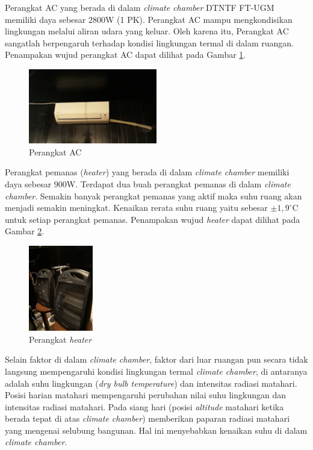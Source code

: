 Perangkat AC yang berada di dalam \textit{climate chamber} DTNTF FT-UGM memiliki daya sebesar 2800W (1 PK). Perangkat AC mampu mengkondisikan lingkungan melalui aliran udara yang keluar. Oleh karena itu, Perangkat AC sangatlah berpengaruh terhadap kondisi lingkungan termal di dalam ruangan. Penampakan wujud perangkat AC dapat dilihat pada Gambar \ref{fig:4:AC}.\\

\begin{figure}[!h]
	\centering
	\includegraphics[width=0.5\textwidth]{figures/AC}
	\caption{Perangkat AC}
	\label{fig:4:AC}
\end{figure}

Perangkat pemanas (\textit{heater}) yang berada di dalam \textit{climate chamber} memiliki daya sebesar 900W. Terdapat dua buah perangkat pemanas di dalam \textit{climate chamber}. Semakin banyak perangkat pemanas yang aktif maka suhu ruang akan menjadi semakin meningkat. Kenaikan rerata suhu ruang yaitu sebesar $\pm1,9^\circ$C untuk setiap perangkat pemanas. Penampakan wujud \textit{heater} dapat dilihat pada Gambar \ref{fig:4:Heater}.

\begin{figure}[!h]
	\centering
	\includegraphics[width=0.25\textwidth]{figures/Heater}
	\caption{Perangkat \textit{heater}}
	\label{fig:4:Heater}
\end{figure}

Selain faktor di dalam \textit{climate chamber}, faktor dari luar ruangan pun secara tidak langsung mempengaruhi kondisi lingkungan termal \textit{climate chamber}, di antaranya adalah suhu lingkungan (\textit{dry bulb temperature}) dan intensitas radiasi matahari. Posisi harian matahari mempengaruhi perubahan nilai suhu lingkungan dan intensitas radiasi matahari. Pada siang hari (posisi \textit{altitude} matahari ketika berada tepat di atas \textit{climate chamber}) memberikan paparan radiasi matahari yang mengenai selubung bangunan. Hal ini menyebabkan kenaikan suhu di dalam \textit{climate chamber}.\\

